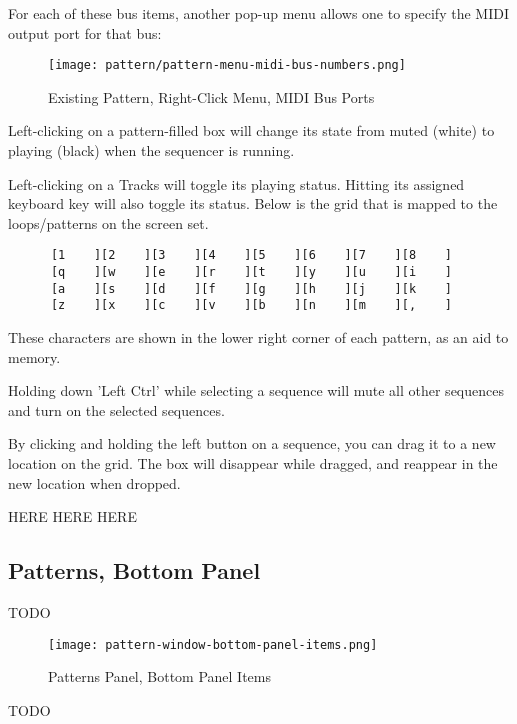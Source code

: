    For each of these bus items, another pop-up menu allows one
   to specify the MIDI output port for that bus:

\begin{figure}[H]
   \centering 
   \texttt{[image: pattern/pattern-menu-midi-bus-numbers.png]}
   \caption{Existing Pattern, Right-Click Menu, MIDI Bus Ports}
   \label{fig:pattern_window_right_click_midi_bus_numbers}
\end{figure}




   Left-clicking on a pattern-filled box will change its state
   from muted (white) to playing (black) when
   the sequencer is running.

   Left-clicking on a Tracks will toggle its playing
   status.  Hitting its assigned keyboard key will
   also toggle its status.  Below is the grid that is
   mapped to the loops/patterns on the screen set.

   \begin{verbatim}
      [1    ][2    ][3    ][4    ][5    ][6    ][7    ][8    ]
      [q    ][w    ][e    ][r    ][t    ][y    ][u    ][i    ]
      [a    ][s    ][d    ][f    ][g    ][h    ][j    ][k    ]
      [z    ][x    ][c    ][v    ][b    ][n    ][m    ][,    ]
   \end{verbatim}

   These characters are shown in the lower right corner of each
   pattern, as an aid to memory.

   Holding down 'Left Ctrl' while selecting a sequence 
   will mute all other sequences and turn on the selected
   sequences.

   By clicking and holding the left button on a sequence,
   you can drag it to a new location on the grid.  The box
   will disappear while dragged, and reappear in the new location when
   dropped.

   HERE HERE HERE



\subsection{Patterns, Bottom Panel}
\label{subsec:seq24_patterns_panel_bottom}

   TODO

\begin{figure}[H]
   \centering 
   \texttt{[image: pattern-window-bottom-panel-items.png]}
   \caption{Patterns Panel, Bottom Panel Items}
   \label{fig:pattern_window_bottom_panel_items}
\end{figure}

   TODO


